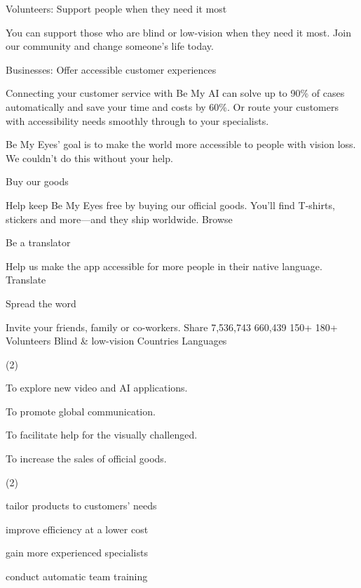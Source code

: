 \documentclass{英语试卷}
\begin{document}
\par Volunteers: Support people when they need it most\par
\par You can support those who are blind or low-vision when they need it most. Join our community and change someone's life today.\par
\par Businesses: Offer accessible customer experiences\par
\par Connecting your customer service with Be My AI can solve up to 90\% of cases automatically and save your time and costs by 60\%. Or route your customers with accessibility needs smoothly through to your specialists.\par
\par Be My Eyes' goal is to make the world more accessible to people with vision loss. We couldn't do this without your help.\par
\par Buy our goods\par
\par Help keep Be My Eyes free by buying our official goods. You'll find T-shirts, stickers and more—and they ship worldwide. Browse\par
\par Be a translator\par
\par Help us make the app accessible for more people in their native language. Translate\par
\par Spread the word\par
\par Invite your friends, family or co-workers. Share 7,536,743 660,439 150+ 180+ Volunteers Blind \& low-vision Countries Languages\par
{}
\begin{choices}(2)
  \item To explore new video and AI applications.
  \item To promote global communication.
  \item To facilitate help for the visually challenged.
  \item To increase the sales of official goods.
\end{choices}
\begin{choices}(2)
  \item tailor products to customers' needs
  \item improve efficiency at a lower cost
  \item gain more experienced specialists
  \item conduct automatic team training
\end{choices}
\end{document}
